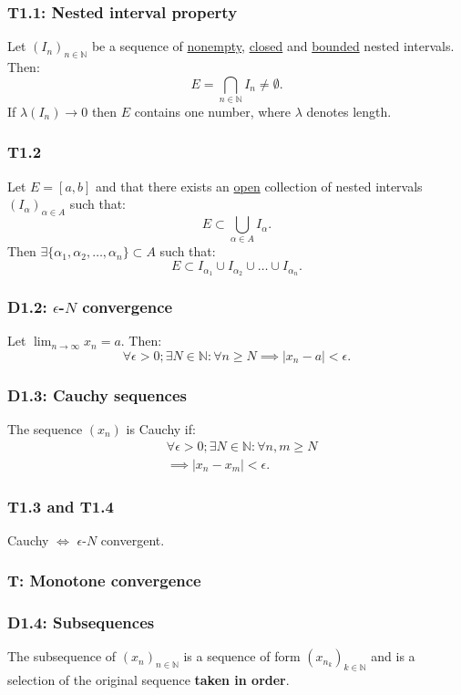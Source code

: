 \documentclass{article}
\begin{document}
\begin{multicols*}{3}
\subsubsection*{T1.1: Nested interval property}
Let $(I_n)_{n\in\mathbb{N}}$ be a sequence of
\underline{nonempty}, \underline{closed}
and \underline{bounded} nested intervals.
Then:
$$E=\bigcap_{n\in\mathbb{N}}I_n
\neq\emptyset.$$
If $\lambda(I_n)\rightarrow0$
then $E$ contains one number,
where $\lambda$ denotes length.

\subsubsection*{T1.2}
Let $E=[a,b]$ and that there exists an \underline{open}
collection of nested intervals
$(I_{\alpha})_{\alpha\in A}$ such that:
$$E\subset\bigcup_{\alpha\in A}I_{\alpha}.$$
Then $\exists\{\alpha_1,\alpha_2,\dots,\alpha_n\}
\subset A$ such that:
$$E\subset I_{\alpha_1}\cup I_{\alpha_2}\cup
\dots\cup I_{\alpha_n}.$$

\subsubsection*{D1.2: $\epsilon$-$N$ convergence}
Let $\displaystyle\lim_{n\rightarrow\infty}x_n=a$. Then:
$$\forall\epsilon>0; \exists N\in\mathbb{N}:
\forall n\geq N\implies |x_n-a|<\epsilon.$$

\subsubsection*{D1.3: Cauchy sequences}
The sequence $(x_n)$ is Cauchy if:
\begin{align*}
    &\forall\epsilon>0;\exists N\in\mathbb{N}:
    \forall n,m\geq N \\ &\implies |x_n-x_m|<\epsilon.
\end{align*}

\subsubsection*{T1.3 and T1.4}
Cauchy $\iff$ $\epsilon$-$N$ convergent.

\subsubsection*{T: Monotone convergence}

\subsubsection*{D1.4: Subsequences}
The subsequence of $(x_n)_{n\in\mathbb{N}}$ is
a sequence of form $(x_{n_k})_{k\in\mathbb{N}}$
and is a selection of the original sequence 
\textbf{taken in order}.


\end{multicols*}
\end{document}
